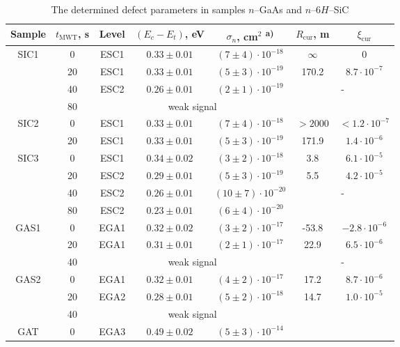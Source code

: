 \documentclass[%
 aip,jap,
 amsmath,amssymb,
 reprint,%
]{revtex4-1}
\begin{document}
\begin{table}
\caption{\label{tabMW}
The determined defect parameters in samples $n$--GaAs and $n$--6$H$--SiC
}
\begin{ruledtabular}
\begin{tabular}{ccccccc}
Sample& $t_\mathrm{MWT}$, s &Level &$(E_c-E_t)$, eV &$\sigma_n$, cm$^2$\textsuperscript{ a)}&$R_\mathrm{cur}$, m&$\xi_\mathrm{cur}$\\
\hline
SIC1& 0 &ESC1& $0.33\pm0.01$ &$(7\pm4)\cdot10^{-18}$&$\infty$&0\\ %
& 20 &ESC1& $0.33\pm0.01$ &$(5\pm3)\cdot10^{-19}$&170.2&$8.7\cdot10^{-7}$\\ %
& 40 &ESC2& $0.26\pm0.01$ &$(2\pm1)\cdot10^{-19}$&\multicolumn{2}{c}{\multirow{2}{*}{-}}\\ %
& 80 & \multicolumn{3}{c}{weak signal}&\multicolumn{2}{c}{}\\ %
SIC2& 0 &ESC1& $0.33\pm0.01$ &$(7\pm4)\cdot10^{-18}$&$>2000$&$<1.2\cdot10^{-7}$\\ %
& 20 &ESC1& $0.33\pm0.01$ &$(5\pm3)\cdot10^{-19}$&171.9&$1.4\cdot10^{-6}$\\ %
SIC3& 0 &ESC1& $0.34\pm0.02$ &$(3\pm2)\cdot10^{-18}$&3.8&$6.1\cdot10^{-5}$\\ %
& 20 &ESC2&$0.29\pm0.01$ &$(5\pm3)\cdot10^{-19}$&5.5&$4.2\cdot10^{-5}$\\ %
& 40 &ESC2& $0.26\pm0.01$ &$(10\pm7)\cdot10^{-20}$&\multicolumn{2}{c}{\multirow{2}{*}{-}}\\ %
& 80 &ESC2& $0.23\pm0.01$ &$(6\pm4)\cdot10^{-20}$&\multicolumn{2}{c}{}\\ %
GAS1& 0 &EGA1& $0.32\pm0.02$ &$(3\pm2)\cdot10^{-17}$&-53.8&$-2.8\cdot10^{-6}$\\ %
& 20 &EGA1& $0.31\pm0.01$ &$(2\pm1)\cdot10^{-17}$&22.9&$6.5\cdot10^{-6}$\\ %
& 40 & \multicolumn{3}{c}{weak signal}&\multicolumn{2}{c}{-}\\ %
GAS2& 0 &EGA1& $0.32\pm0.01$ &$(4\pm2)\cdot10^{-17}$&17.2&$8.7\cdot10^{-6}$\\ %
& 20 &EGA2& $0.28\pm0.01$ &$(5\pm2)\cdot10^{-18}$&14.7&$1.0\cdot10^{-5}$\\ %
& 40 & \multicolumn{3}{c}{weak signal}&\multicolumn{2}{c}{}\\ %
GAT& 0 &EGA3& $0.49\pm0.02$ &$(5\pm3)\cdot10^{-14}$&\multicolumn{2}{c}{}\\ %

\end{tabular}
\end{ruledtabular}
\end{table}
\end{document}
